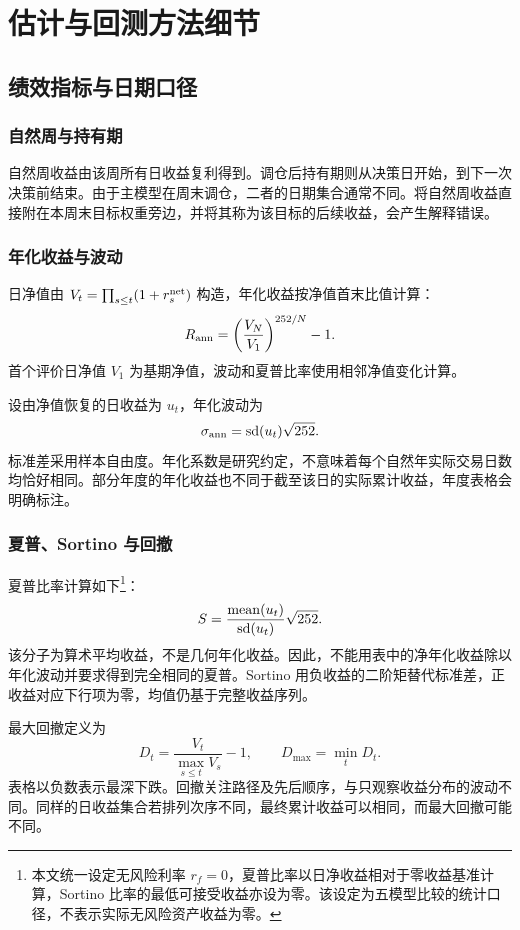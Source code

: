 \section{估计与回测方法细节}
\label{app:methods}
\subsection{绩效指标与日期口径}
\label{app:metrics}
\subsubsection{自然周与持有期}
自然周收益由该周所有日收益复利得到。调仓后持有期则从决策日开始，到下一次决策前结束。由于主模型在周末调仓，二者的日期集合通常不同。将自然周收益直接附在本周末目标权重旁边，并将其称为该目标的后续收益，会产生解释错误。

\subsubsection{年化收益与波动}
日净值由 $V_t=\prod_{s\leq t}(1+r_s^{\rm net})$ 构造，年化收益按净值首末比值计算：
\[
R_{\rm ann}=\left(\frac{V_N}{V_1}\right)^{252/N}-1.
\]
首个评价日净值 $V_1$ 为基期净值，波动和夏普比率使用相邻净值变化计算。

设由净值恢复的日收益为 $u_t$，年化波动为
\[
\sigma_{\rm ann}=\operatorname{sd}(u_t)\sqrt{252}.
\]
标准差采用样本自由度。年化系数是研究约定，不意味着每个自然年实际交易日数均恰好相同。部分年度的年化收益也不同于截至该日的实际累计收益，年度表格会明确标注。

\subsubsection{夏普、Sortino 与回撤}
夏普比率计算如下\footnote{本文统一设定无风险利率 $r_f=0$，夏普比率以日净收益相对于零收益基准计算，Sortino 比率的最低可接受收益亦设为零。该设定为五模型比较的统计口径，不表示实际无风险资产收益为零。}：
\[
S=\frac{\operatorname{mean}(u_t)}{\operatorname{sd}(u_t)}\sqrt{252}.
\]
该分子为算术平均收益，不是几何年化收益。因此，不能用表中的净年化收益除以年化波动并要求得到完全相同的夏普。Sortino 用负收益的二阶矩替代标准差，正收益对应下行项为零，均值仍基于完整收益序列。

最大回撤定义为
\[
D_t=\frac{V_t}{\max_{s\leq t}V_s}-1,\qquad
D_{\max}=\min_t D_t.
\]
表格以负数表示最深下跌。回撤关注路径及先后顺序，与只观察收益分布的波动不同。同样的日收益集合若排列次序不同，最终累计收益可以相同，而最大回撤可能不同。

